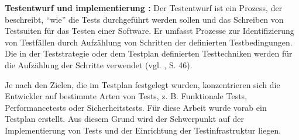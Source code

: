 \textbf{Testentwurf und implementierung :} Der Testentwurf ist ein Prozess,
der beschreibt, ``wie'' die Tests durchgef\"uhrt werden sollen und das
Schreiben von Testsuiten f\"ur das Testen einer Software. Er umfasst Prozesse
zur Identifizierung von Testf\"allen durch Aufz\"ahlung von Schritten der
definierten Testbedingungen. Die in der Teststrategie oder dem Testplan
definierten Testtechniken werden f\"ur die Aufz\"ahlung
der Schritte verwendet (vgl. \cite{shultz2011software}, S. 46).



Je nach den Zielen, die im Testplan festgelegt wurden, konzentrieren sich die
Entwickler auf bestimmte Arten von Tests, z. B. Funktionale Tests,
Performancetests oder Sicherheitstests. F\"ur diese Arbeit wurde vorab ein
Testplan erstellt. Aus diesem Grund wird der Schwerpunkt auf der Implementierung
von Tests und der Einrichtung der Testinfrastruktur liegen.

